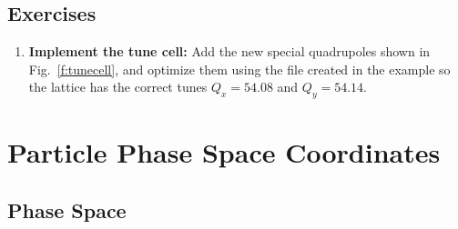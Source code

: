 \documentclass{hitec}     %
\begin{document}
{%
\subsection{Exercises}

\begin{enumerate}[leftmargin=*]
    \item {\bf Implement the tune cell:} Add the new special quadrupoles shown in Fig.~\ref{f:tunecell}, and optimize them using the  file created in the example so the lattice has the correct tunes $Q_x=54.08$ and $Q_y=54.14$.
\end{enumerate}


\newpage

\section{Particle Phase Space Coordinates}
\label{s:phase.space}

\subsection{Phase Space}

}
\end{document}
